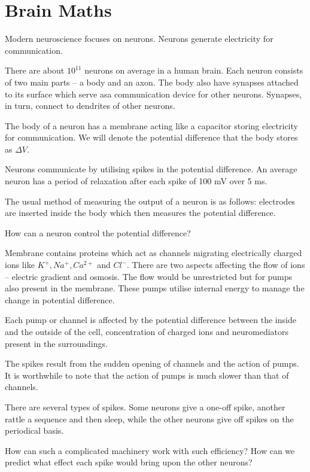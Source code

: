 \documentclass[11pt]{scrartcl}
\begin{document}
  \section{Brain Maths}

  Modern neuroscience focuses on neurons. Neurons generate
  electricity for communication.

  There are about $10^{11}$ neurons on average in a human brain. Each
  neuron consists of two main parts -- a body and an axon. The body
  also have synapses attached to its surface which serve asa
  communication device for other neurons. Synapses, in turn, connect
  to dendrites of other neurons.

  The body of a neuron has a membrane acting like a capacitor storing
  electricity for communication. We will denote the potential
  difference that the body stores as $\Delta V$.

  Neurons communicate by utilising spikes in the potential difference.
  An average neuron has a period of relaxation after each spike of 100
  mV over 5 ms.

  The usual method of measuring the output of a neuron is as follows:
  electrodes are inserted inside the body which then measures the
  potential difference.

  How can a neuron control the potential difference?

  Membrane contains proteins which act as channels migrating
  electrically charged ions like $K^{+}, Na^{+}, Ca^{2+} $ and
  $Cl^{-}$. There are two aspects affecting the flow of ions --
  electric gradient and osmosis. The flow would be unrestricted but
  for pumps also present in the membrane. These pumps utilise internal
  energy to manage the change in potential difference.

  Each pump or channel is affected by the potential difference between
  the inside and the outside of the cell, concentration of charged
  ions and neuromediators present in the surroundings.

  The spikes result from the sudden opening of channels and the action
  of pumps. It is worthwhile to note that the action of pumps is much
  slower than that of channels.

  There are several types of spikes. Some neurons give a one-off
  spike, another rattle a sequence and then sleep, while the other
  neurons give off spikes on the periodical basis.

  How can such a complicated machinery work with such efficiency? How
  can we predict what effect each spike would bring upon the other
  neurons?
\end{document}
